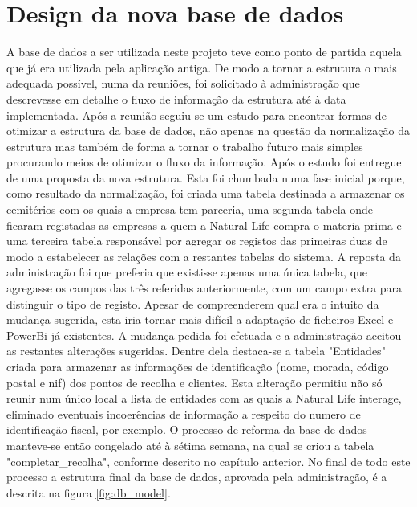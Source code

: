 \section{Design da nova base de dados}
A base de dados a ser utilizada neste projeto teve como ponto de partida aquela que já era utilizada pela aplicação antiga. De modo a tornar a estrutura o mais adequada possível, numa da reuniões, foi solicitado à administração que descrevesse em detalhe o fluxo de informação da estrutura até à data implementada. Após a reunião seguiu-se um estudo para encontrar formas de otimizar a estrutura da base de dados, não apenas na questão da normalização da estrutura mas também de forma a tornar o trabalho futuro mais simples procurando meios de otimizar o fluxo da informação. Após o estudo foi entregue de uma proposta da nova estrutura. Esta foi chumbada numa fase inicial porque, como resultado da normalização, foi criada uma tabela destinada a armazenar os cemitérios com os quais a empresa tem parceria, uma segunda tabela onde ficaram registadas as empresas a quem a Natural Life compra o materia-prima e uma terceira tabela responsável por agregar os registos das primeiras duas de modo a estabelecer as relações com a restantes tabelas do sistema. A reposta da administração foi que preferia que existisse apenas uma única tabela, que agregasse os campos das três referidas anteriormente, com um campo extra para distinguir o tipo de registo. Apesar de compreenderem qual era o intuito da mudança sugerida, esta iria tornar mais difícil a adaptação de ficheiros Excel e PowerBi já existentes. A mudança pedida foi efetuada e a administração aceitou as restantes alterações sugeridas. Dentre dela destaca-se a tabela "Entidades" criada para armazenar as informações de identificação (nome, morada, código postal e nif) dos pontos de recolha e clientes. Esta alteração permitiu não só reunir num único local a lista de entidades com as quais a Natural Life interage, eliminado eventuais incoerências de informação a respeito do numero de identificação fiscal, por exemplo.
O processo de reforma da base de dados manteve-se então congelado até à sétima semana, na qual se criou a tabela "completar\_recolha", conforme descrito no capítulo anterior. No final de todo este processo a estrutura final da base de dados, aprovada pela administração, é a descrita na figura \ref{fig:db_model}.

